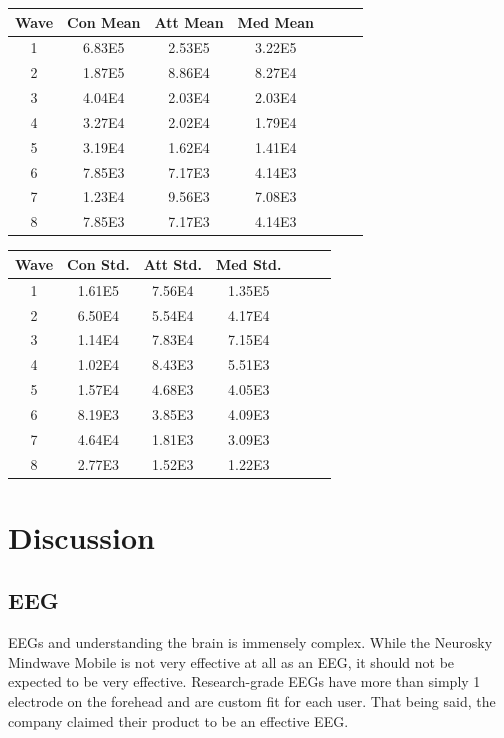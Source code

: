 \documentclass[journal]{IEEEtran}
\begin{document}
    \begin{center}
    \begin{tabular}{||c c c c c c c||} 
    \hline
    Wave & Con Mean & Att Mean & Med Mean \\ [0.5ex] 
    \hline\hline
    1 & 6.83E5 & 2.53E5 & 3.22E5 \\ 
    \hline
    2 & 1.87E5 & 8.86E4 & 8.27E4 \\
    \hline
    3 & 4.04E4 & 2.03E4 & 2.03E4 \\
    \hline
    4 & 3.27E4 & 2.02E4 & 1.79E4 \\
    \hline
    5 & 3.19E4 & 1.62E4 & 1.41E4 \\
    \hline
    6 & 7.85E3 & 7.17E3 & 4.14E3 \\
    \hline
    7 & 1.23E4 & 9.56E3 & 7.08E3 \\
    \hline
    8 & 7.85E3 & 7.17E3 & 4.14E3 \\ [1ex] 
    \hline
    \end{tabular}

    \end{center}
    


\begin{center}
 \begin{tabular}{||c c c c c c c||} 
 \hline
 Wave & Con Std. & Att Std. & Med Std. \\ [0.5ex] 
 \hline\hline
 1 & 1.61E5 & 7.56E4 & 1.35E5 \\ 
 \hline
 2 & 6.50E4 & 5.54E4 & 4.17E4 \\
 \hline
 3 & 1.14E4 & 7.83E4 & 7.15E4 \\
 \hline
 4 & 1.02E4 & 8.43E3 & 5.51E3 \\
  \hline
 5 & 1.57E4 & 4.68E3 & 4.05E3 \\
  \hline
 6 & 8.19E3 & 3.85E3 & 4.09E3 \\
  \hline
 7 & 4.64E4 & 1.81E3 & 3.09E3 \\
 \hline
 8 & 2.77E3 & 1.52E3 & 1.22E3 \\ [1ex] 
 \hline
\end{tabular}
\end{center}


\section{Discussion}
\subsection{EEG}
EEGs and understanding the brain is immensely complex. While the Neurosky Mindwave Mobile is not very effective at all as an EEG, it should not be expected to be very effective. Research-grade EEGs have more than simply 1 electrode on the forehead and are custom fit for each user. That being said, the company claimed their product to be an effective EEG. \par
\end{document}
